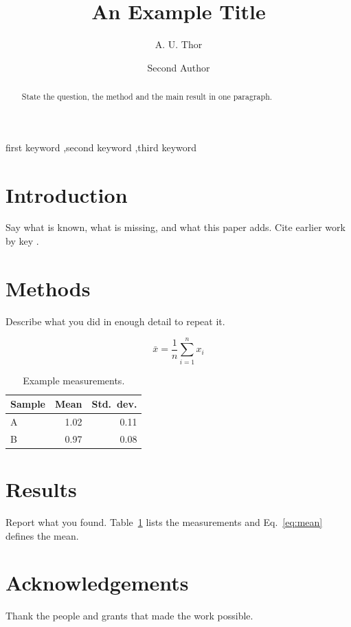 \documentclass[preprint,12pt]{elsarticle}
\begin{document}
\begin{frontmatter}

\title{An Example Title}

\author[first]{A. U. Thor}
\author[second]{Second Author}


\begin{abstract}
State the question, the method and the main result in one paragraph.
\end{abstract}

\begin{keyword}
first keyword \sep second keyword \sep third keyword
\end{keyword}

\end{frontmatter}

\section{Introduction}

Say what is known, what is missing, and what this paper adds. Cite earlier
work by key \cite{einstein1905,knuth1984}.

\section{Methods}

Describe what you did in enough detail to repeat it.

\begin{equation}
  \bar{x} = \frac{1}{n} \sum_{i=1}^{n} x_i
  \label{eq:mean}
\end{equation}

\begin{table}[h]
  \centering
  \begin{tabular}{lrr}
    \toprule
    Sample & Mean & Std.\ dev. \\
    \midrule
    A & 1.02 & 0.11 \\
    B & 0.97 & 0.08 \\
    \bottomrule
  \end{tabular}
  \caption{Example measurements.}
  \label{tab:results}
\end{table}

\section{Results}

Report what you found. Table~\ref{tab:results} lists the measurements and
Eq.~\eqref{eq:mean} defines the mean.

\section*{Acknowledgements}

Thank the people and grants that made the work possible.



\end{document}
